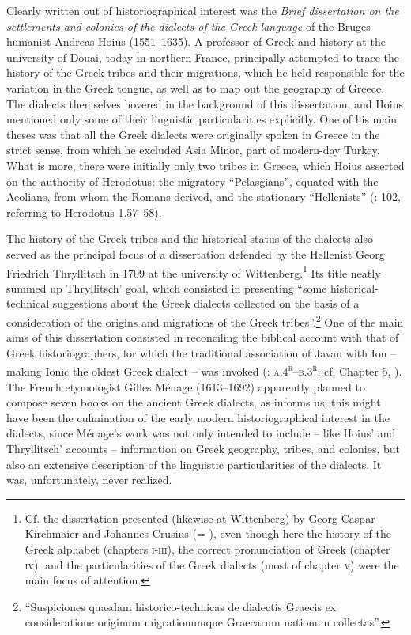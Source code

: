 Clearly written out of historiographical interest was the \textit{Brief dissertation on the settlements and colonies of the dialects of the Greek language}  of the Bruges humanist Andreas Hoius (1551–1635). A professor of Greek and history at the university of Douai, today in northern France, \citet[95]{Hoius1620} principally attempted to trace the history of the Greek tribes and their migrations, which he held responsible for the variation in the Greek tongue, as well as to map out the geography of Greece. The dialects themselves hovered in the background of this dissertation, and Hoius mentioned only some of their linguistic particularities explicitly. One of his main theses was that all the Greek dialects were originally spoken in Greece in the strict sense, from which he excluded Asia Minor, part of modern-day Turkey.\textsuperscript{} What is more, there were initially only two tribes in Greece, which Hoius asserted on the authority of Herodotus: the migratory “Pelasgians”, equated with the Aeolians, from whom the Romans derived, and the stationary “Hellenists” (\citealt{Hoius1620}: 102, referring to Herodotus 1.57–58).

The history of the Greek tribes and the historical status of the dialects also served as the principal focus of a dissertation defended by the Hellenist Georg Friedrich Thryllitsch in 1709 at the university of Wittenberg.\footnote{Cf. the dissertation presented (likewise at Wittenberg) by Georg Caspar Kirchmaier and Johannes Crusius (= \citealt{KirchmaierCrusius1684}), even though here the history of the Greek alphabet (chapters \textsc{i}{}-\textsc{iii}), the correct pronunciation of Greek (chapter \textsc{iv}), and the particularities of the Greek dialects (most of chapter \textsc{v}) were the main focus of attention.} Its title neatly summed up Thryllitsch’ goal, which consisted in presenting “some historical-technical suggestions about the Greek dialects collected on the basis of a consideration of the origins and migrations of the Greek tribes”.\footnote{“Suspiciones quasdam historico-technicas de dialectis Graecis ex consideratione originum migrationumque Graecarum nationum collectas”.} One of the main aims of this dissertation consisted in reconciling the biblical account with that of Greek historiographers, for which the traditional association of Javan with Ion – making Ionic the oldest Greek dialect – was invoked (\citealt{Thryllitsch1709}: \textsc{a.4}\textsc{\textsuperscript{r}}\textsc{–b.3}\textsc{\textsuperscript{r}}; cf. Chapter 5, ). The French etymologist Gilles Ménage (1613–1692) apparently planned to compose seven books on the ancient Greek dialects, as \citet[252]{Leibniz1991} informs us; this might have been the culmination of the early modern historiographical interest in the dialects, since Ménage’s work was not only intended to include – like Hoius’ and Thryllitsch’ accounts – information on Greek geography, tribes, and colonies, but also an extensive description of the linguistic particularities of the dialects. It was, unfortunately, never realized.

